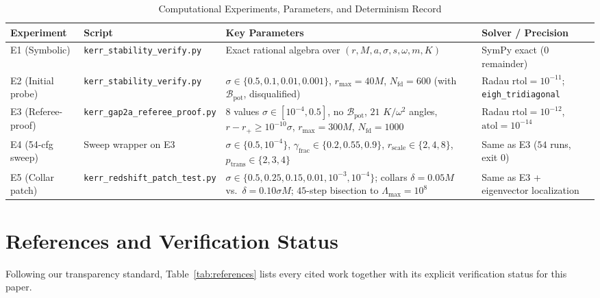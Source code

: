 \documentclass[11pt, a4paper]{article}
\theoremstyle{remark}
\begin{document}
\begin{table}[h]
\centering
\caption{Computational Experiments, Parameters, and Determinism Record}
\label{tab:repro}
\small
\begin{tabular}{@{}p{2.6cm}p{4.3cm}p{5.5cm}p{2.6cm}@{}}
\toprule
\textbf{Experiment} & \textbf{Script} & \textbf{Key Parameters} & \textbf{Solver / Precision} \\
\midrule
E1 (Symbolic) & \texttt{kerr\_stability\_verify.py} & Exact rational algebra over $(r, M, a, \sigma, s, \omega, m, K)$ & SymPy exact ($0$ remainder) \\
\addlinespace[3pt]
E2 (Initial probe) & \texttt{kerr\_stability\_verify.py} & $\sigma \in \{0.5, 0.1, 0.01, 0.001\}$, $r_{\max} = 40M$, $N_{\mathrm{fd}} = 600$ (with $\mathcal{B}_{\mathrm{pot}}$, disqualified) & Radau $\mathrm{rtol}=10^{-11}$; \texttt{eigh\_tridiagonal} \\
\addlinespace[3pt]
E3 (Referee-proof) & \texttt{kerr\_gap2a\_referee\_proof.py} & $8$ values $\sigma \in [10^{-4}, 0.5]$, no $\mathcal{B}_{\mathrm{pot}}$, $21$ $K/\omega^2$ angles, $r - r_+ \ge 10^{-10}\sigma$, $r_{\max} = 300M$, $N_{\mathrm{fd}} = 1000$ & Radau $\mathrm{rtol}=10^{-12}$, $\mathrm{atol}=10^{-14}$ \\
\addlinespace[3pt]
E4 (54-cfg sweep) & Sweep wrapper on E3 & $\sigma \in \{0.5, 10^{-4}\}$, $\gamma_{\mathrm{frac}} \in \{0.2, 0.55, 0.9\}$, $r_{\mathrm{scale}} \in \{2, 4, 8\}$, $p_{\mathrm{trans}} \in \{2, 3, 4\}$ & Same as E3 ($54$ runs, exit $0$) \\
\addlinespace[3pt]
E5 (Collar patch) & \texttt{kerr\_redshift\_patch\_test.py} & $\sigma \in \{0.5, 0.25, 0.15, 0.01, 10^{-3}, 10^{-4}\}$; collars $\delta = 0.05M$ vs.\ $\delta = 0.10\sigma M$; $45$-step bisection to $\Lambda_{\max} = 10^8$ & Same as E3 + eigenvector localization \\
\bottomrule
\end{tabular}
\end{table}

\section*{References and Verification Status}

Following our transparency standard, Table~\ref{tab:references} lists every cited work together with its explicit verification status for this paper.
\end{document}
